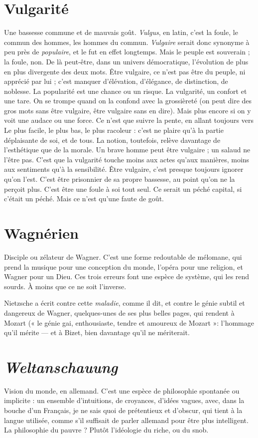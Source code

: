 \section{Vulgarité}
Une bassesse commune et de mauvais goût.
{\it Vulgus}, en latin, c’est la foule, le commun des hommes, les
hommes du commun. {\it Vulgaire} serait donc synonyme à peu près de {\it populaire},
et le fut en effet longtemps. Mais le peuple est souverain ; la foule, non. De là
peut-être, dans un univers démocratique, l’évolution de plus en plus divergente
des deux mots. Être vulgaire, ce n’est pas être du peuple, ni apprécié par lui ;
c’est manquer d’élévation, d'élégance, de distinction, de noblesse. La popularité
est une chance ou un risque. La vulgarité, un confort et une tare. On se trompe
quand on la confond avec la grossièreté (on peut dire des gros mots sans être
vulgaire, être vulgaire sans en dire). Mais plus encore si on y voit une audace ou
une force. Ce n’est que suivre la pente, en allant toujours vers Le plus facile, le
plus bas, le plus racoleur : c’est ne plaire qu’à la partie déplaisante de soi, et de
tous. La notion, toutefois, relève davantage de l’esthétique que de la morale.
Un brave homme peut être vulgaire ; un salaud ne l’être pas. C’est que la vulgarité
touche moins aux actes qu’aux manières, moins aux sentiments qu'à la
sensibilité. Être vulgaire, c’est presque toujours ignorer qu’on l’est. C’est être
prisonnier de sa propre bassesse, au point qu’on ne la perçoit plus. C’est être
une foule à soi tout seul. Ce serait un péché capital, si c'était un péché. Mais ce
n’est qu’une faute de goût.

\section{Wagnérien}
Disciple ou zélateur de Wagner. C’est une forme redoutable
de mélomane, qui prend la musique pour une conception du
monde, l’opéra pour une religion, et Wagner pour un Dieu. Ces trois erreurs
font une espèce de système, qui les rend sourds. À moins que ce ne soit
l'inverse.

Nietzsche a écrit contre cette {\it maladie}, comme il dit, et contre le génie
subtil et dangereux de Wagner, quelques-unes de ses plus belles pages, qui rendent
à Mozart (« le génie gai, enthousiaste, tendre et amoureux de Mozart »:
l'hommage qu’il mérite — et à Bizet, bien davantage qu’il ne mériterait.

\section{{\it Weltanschauung}}
Vision du monde, en allemand. C’est une espèce de
philosophie spontanée ou implicite : un ensemble
d’intuitions, de croyances, d’idées vagues, avec, dans la bouche d’un Français,
je ne sais quoi de prétentieux et d’obscur, qui tient à la langue utilisée, comme
s’il suffisait de parler allemand pour être plus intelligent. La philosophie du
pauvre ? Plutôt l’idéologie du riche, ou du snob.

